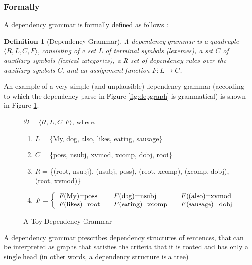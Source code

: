 \documentclass{report}
\theoremstyle{break}
\newtheorem{definition}{Definition}
\begin{document}
\subsubsection{Formally}

A dependency grammar is formally defined as follows \citep{hays1964dependency,gaifman1965dependency}:

\begin{definition}[Dependency Grammar]\label{def:depgram}
A dependency grammar is a quadruple $\langle R,L,C,F\rangle$, consisting of a set $L$ of terminal symbols (lexemes), a set $C$ of auxiliary symbols (lexical categories), a $R$ set of dependency rules over the auxiliary symbols $C$, and an assignment function $F : L\rightarrow C$.
\end{definition}

An example of a very simple (and unplausible) dependency grammar (according to which the dependency parse in Figure \ref{fig:depgraph} is grammatical) is shown in Figure \ref{fig:depgrammar}.

\begin{figure}[!ht]
\begin{framed}
$\mathcal{D} = \langle R,L,C,F\rangle$, where:\begin{enumerate}
\item[] $L$ = \{My, dog, also, likes, eating, sausage\}
\item[] $C$ = \{poss, nsubj, xvmod, xcomp, dobj, root\}
\item[] $R$ = \{(root, nsubj), (nsubj, poss), (root, xcomp), (xcomp, dobj), (root, xvmod)\}
\item[] $F = \left\{
  \begin{array}{l l l}
	F\text{(My)=poss} & \quad F\text{(dog)=nsubj} & \quad F(\text{(also)=xvmod}\\
	F\text{(likes)=root}& \quad F\text{(eating)=xcomp} & \quad F\text{(sausage)=dobj} 
  \end{array} \right.$
\end{enumerate}
\end{framed}
\caption{A Toy Dependency Grammar}\label{fig:depgrammar}
\end{figure}


\noindent A dependency grammar prescribes dependency structures of sentences, that can be interpreted as graphs that satisfies the criteria that it is rooted and has only a single head (in other words, a dependency structure is a tree):
\end{document}
